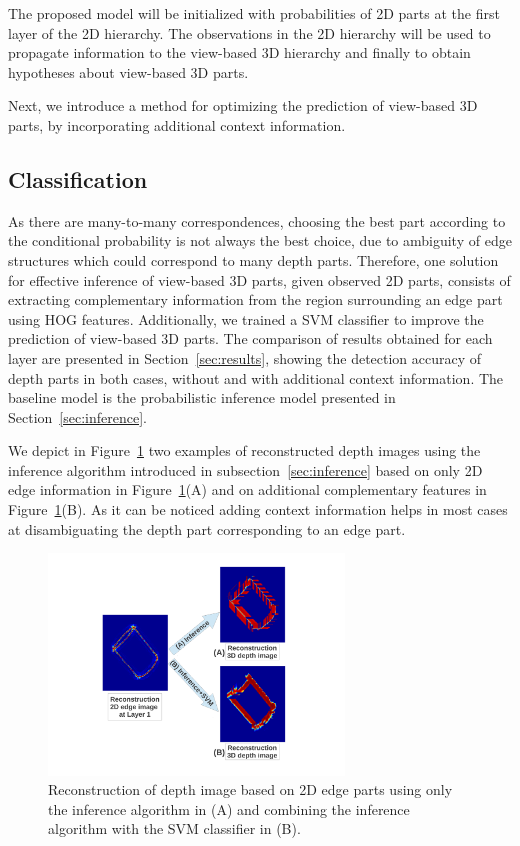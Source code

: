 \documentclass[runningheads]{llncs}
\begin{document}
The proposed model will be initialized with probabilities of 2D parts at the first layer of the 2D hierarchy. The observations in the 2D hierarchy will be used to propagate information to the view-based 3D hierarchy and finally to obtain hypotheses about view-based 3D parts. 

Next, we introduce a method for optimizing the prediction of view-based 3D parts, by incorporating additional context information.

\subsection{Classification}

As there are many-to-many correspondences, choosing the best part according to the conditional probability is not always the best choice, due to ambiguity of edge structures which could correspond to many depth parts. Therefore, one solution for effective inference of view-based 3D parts, given observed 2D parts, consists of extracting complementary information from the region surrounding an edge part using HOG features. Additionally, we trained a SVM classifier to improve the prediction of view-based 3D parts. 
The comparison of results obtained for each layer are presented in Section~\ref{sec:results}, showing the detection accuracy of depth parts in both cases, without and with additional context information. The baseline model is the probabilistic inference model presented in Section~\ref{sec:inference}.

We depict in Figure~\ref{classification} two examples of reconstructed depth images using the inference algorithm introduced in subsection~\ref{sec:inference} based on only 2D edge information in Figure~\ref{classification}(A) and on additional complementary features in Figure~\ref{classification}(B). As it can be noticed adding context information helps in most cases at disambiguating the depth part corresponding to an edge part.

\begin{figure}
\begin{center}
\includegraphics[width=0.7\textwidth]{classification}
\end{center}
\caption{Reconstruction of depth image based on 2D edge parts using only the inference algorithm in (A) and combining the inference algorithm with the SVM classifier in (B).}
\label{classification}
\end{figure}
\end{document}
